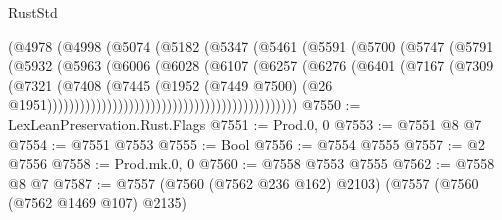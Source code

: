 \begin{lexlean}{RustStd}
\begin{coremodule}
                                              (@4978
                                                (@4998
                                                  (@5074
                                                    (@5182
                                                      (@5347
                                                        (@5461
                                                          (@5591
                                                            (@5700
                                                              (@5747
                                                                (@5791
                                                                  (@5932
                                                                    (@5963
                                                                      (@6006
                                                                        (@6028
                                                                          (@6107
                                                                            (@6257
                                                                              (@6276
                                                                                (@6401
                                                                                  (@7167
                                                                                    (@7309
                                                                                      (@7321
                                                                                        (@7408
                                                                                          (@7445
                                                                                            (@1952
                                                                                              (@7449
                                                                                                @7500)
                                                                                              (@26
                                                                                                @1951))))))))))))))))))))))))))))))))))))))))))))))
@7550 := LexLeanPreservation.Rust.Flags
@7551 := Prod.{0, 0}
@7553 := @7551 @8 @7
@7554 := @7551 @7553
@7555 := Bool
@7556 := @7554 @7555
@7557 := @2 @7556
@7558 := Prod.mk.{0, 0}
@7560 := @7558 @7553 @7555
@7562 := @7558 @8 @7
@7587 := @7557
    (@7560 (@7562 @236 @162) @2103)
    (@7557
      (@7560 (@7562 @1469 @107) @2135)

\end{coremodule}
\end{lexlean}
